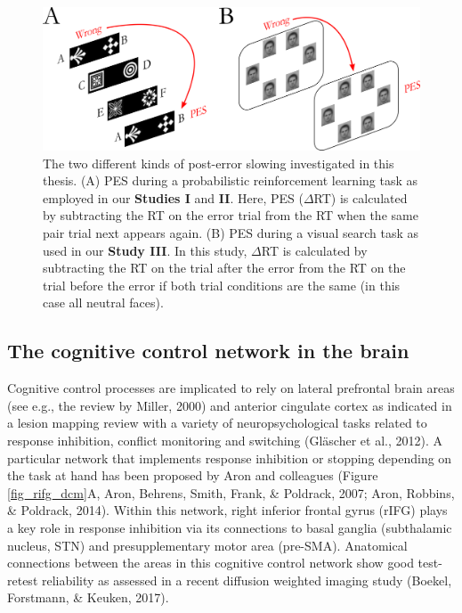 \documentclass[12pt,openany]{book}
\theoremstyle{definition}
\theoremstyle{definition}
\theoremstyle{definition}
\theoremstyle{remark}
\begin{document}
\begin{figure}
\centering
\includegraphics{./figures/pes_memory_direct.png}
\caption{The two different kinds of post-error slowing investigated in
this thesis. (A) PES during a probabilistic reinforcement learning task
as employed in our \textbf{Studies I} and \textbf{II}. Here, PES
(\(\Delta\)RT) is calculated by subtracting the RT on the error trial
from the RT when the same pair trial next appears again. (B) PES during
a visual search task as used in our \textbf{Study III}. In this study,
\(\Delta\)RT is calculated by subtracting the RT on the trial after the
error from the RT on the trial before the error if both trial conditions
are the same (in this case all neutral faces).\label{fig_pes}}
\end{figure}

\subsection{The cognitive control network in the
brain}\label{the-cognitive-control-network-in-the-brain}

Cognitive control processes are implicated to rely on lateral prefrontal
brain areas (see e.g., the review by Miller, 2000) and anterior
cingulate cortex as indicated in a lesion mapping review with a variety
of neuropsychological tasks related to response inhibition, conflict
monitoring and switching (Gläscher et al., 2012). A particular network
that implements response inhibition or stopping depending on the task at
hand has been proposed by Aron and colleagues (Figure
\ref{fig_rifg_dcm}A, Aron, Behrens, Smith, Frank, \& Poldrack, 2007;
Aron, Robbins, \& Poldrack, 2014). Within this network, right inferior
frontal gyrus (rIFG) plays a key role in response inhibition via its
connections to basal ganglia (subthalamic nucleus, STN) and
presupplementary motor area (pre-SMA). Anatomical connections between
the areas in this cognitive control network show good test-retest
reliability as assessed in a recent diffusion weighted imaging study
(Boekel, Forstmann, \& Keuken, 2017).
\end{document}
